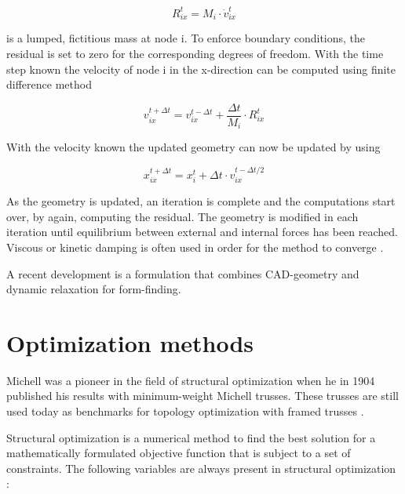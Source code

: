 \begin{equation*}
  R^t_{ix} = M_i  \cdot \dot{v}^t_{ix}
\end{equation*}

 is a lumped, fictitious mass at node i. To enforce boundary conditions, the residual is set to zero for the corresponding degrees of freedom. With the time step known the velocity of node i in the x-direction can be computed using finite difference method

\begin{equation*}
  v^{t+\Delta t}_{ix} = v^{t-\Delta t}_{ix} + \frac{\Delta t}{M_i} \cdot R^t_{ix}
\end{equation*}

With the velocity known the updated geometry can now be updated by using

\begin{equation*}
  x^{t+\Delta t}_{ix} = x^t_i + \Delta t \cdot v_{ix}^{t-\Delta t / 2}
\end{equation*}

As the geometry is updated, an iteration is complete and the computations start over, by again, computing the residual. The geometry is modified in each iteration until equilibrium between external and internal forces has been reached. Viscous or kinetic damping is often used in order for the method to converge \cite{barnes1988form}.

A recent development is a formulation that combines CAD-geometry and dynamic relaxation \cite{Alic2015} for form-finding.

\section{Optimization methods}
Michell was a pioneer in the field of structural optimization \cite{Michell1904} when he in 1904 published his results with minimum-weight Michell trusses. These trusses are still used today as benchmarks for topology optimization with framed trusses \cite{Clune2013}. 

Structural optimization is a numerical method to find the best solution for a mathematically formulated objective function that is subject to a set of constraints. The following variables are always present in structural optimization \cite{christensen2008introduction}:

